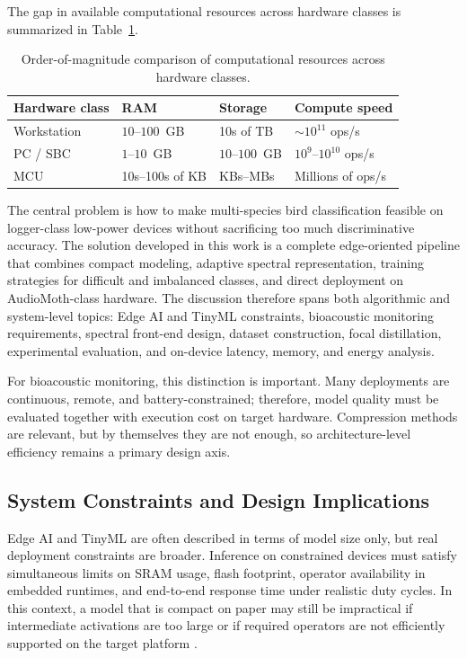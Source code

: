 \documentclass[a4paper,singleside,12pt]{report} %
\begin{document}
	The gap in available computational resources across hardware classes is summarized in Table~\ref{tab:computational_resources_comparison}.

	\begin{table}[H]
		\centering
		\scriptsize
		\renewcommand{\arraystretch}{1.15}
		\setlength{\tabcolsep}{6pt}
		\caption{Order-of-magnitude comparison of computational resources across hardware classes.}
		\label{tab:computational_resources_comparison}
		\begin{tabular}{|p{2.6cm}|p{2.6cm}|p{2.3cm}|p{3.0cm}|}
			\hline
			Hardware class & RAM & Storage & Compute speed \\
			\hline
			Workstation & \(10\)--\(100\)~GB & 10s of TB & \(\sim 10^{11}\) ops/s \\
			\hline
			PC / SBC & \(1\)--\(10\)~GB & \(10\)--\(100\)~GB & \(10^{9}\)--\(10^{10}\) ops/s \\
			\hline
			MCU & 10s--100s of KB & KBs--MBs & Millions of ops/s \\
			\hline
		\end{tabular}
	\end{table}

	The central problem is how to make multi-species bird classification feasible on logger-class low-power devices without sacrificing too much discriminative accuracy. The solution developed in this work is a complete edge-oriented pipeline that combines compact modeling, adaptive spectral representation, training strategies for difficult and imbalanced classes, and direct deployment on AudioMoth-class hardware. The discussion therefore spans both algorithmic and system-level topics: Edge AI and TinyML constraints, bioacoustic monitoring requirements, spectral front-end design, dataset construction, focal distillation, experimental evaluation, and on-device latency, memory, and energy analysis.

	For bioacoustic monitoring, this distinction is important. Many deployments are continuous, remote, and battery-constrained; therefore, model quality must be evaluated together with execution cost on target hardware. Compression methods are relevant, but by themselves they are not enough, so architecture-level efficiency remains a primary design axis.
	\subsection{System Constraints and Design Implications}
	Edge AI and TinyML are often described in terms of model size only, but real deployment constraints are broader. Inference on constrained devices must satisfy simultaneous limits on SRAM usage, flash footprint, operator availability in embedded runtimes, and end-to-end response time under realistic duty cycles. In this context, a model that is compact on paper may still be impractical if intermediate activations are too large or if required operators are not efficiently supported on the target platform \cite{abadade2023tinymlsurvey,singh2023edgeaisurvey}.
\end{document}
